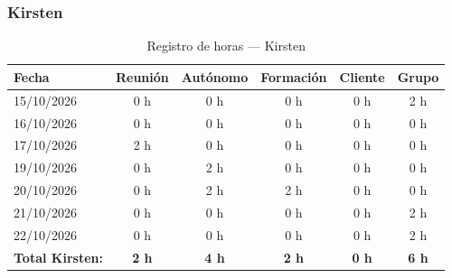 \subsubsection{Kirsten}
\begin{table}[H]
\centering
\small
\begin{tabularx}{\textwidth}{l c c c c c}
\toprule
\textbf{Fecha} & \textbf{Reunión} & \textbf{Autónomo} & \textbf{Formación} & \textbf{Cliente} & \textbf{Grupo} \\
\midrule
15/10/2026 & 0 h & 0 h & 0 h & 0 h & 2 h \\
16/10/2026 & 0 h & 0 h & 0 h & 0 h & 0 h \\
17/10/2026 & 2 h & 0 h & 0 h & 0 h & 0 h \\
19/10/2026 & 0 h & 2 h & 0 h & 0 h & 0 h \\
20/10/2026 & 0 h & 2 h & 2 h & 0 h & 0 h \\
21/10/2026 & 0 h & 0 h & 0 h & 0 h & 2 h \\
22/10/2026 & 0 h & 0 h & 0 h & 0 h & 2 h \\
\midrule
\textbf{Total Kirsten:} & \textbf{2 h} & \textbf{4 h} & \textbf{2 h} & \textbf{0 h} & \textbf{6 h} \\
\bottomrule
\end{tabularx}
\caption{Registro de horas — Kirsten}
\end{table}